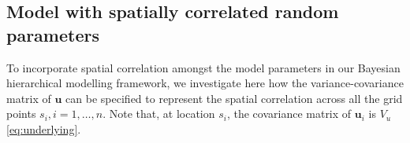 \documentclass[a4paper]{article}   	%
\newcommand{\N}{\mathcal{N}}
\begin{document}
	\subsection{Model with spatially correlated random parameters}\label{ss:spatcorrrp}
	
	
	To incorporate spatial correlation amongst the model parameters in our Bayesian hierarchical modelling framework, we investigate here how the variance-covariance matrix of $\bm{u}$ can be specified to represent the spatial correlation across all the grid points $s_i, i=1,\ldots,n$. Note that, at location $s_i$, the covariance matrix of $\bm{u}_i$ is $V_u$ \eqref{eq:underlying}. %
	
\end{document}
